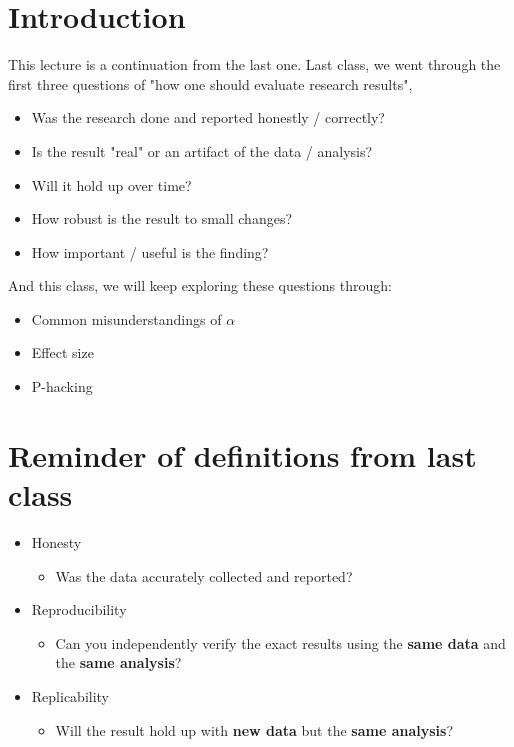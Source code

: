 
\section{Introduction}
This lecture is a continuation from the last one. Last class, we went through the first three questions of "how one should evaluate research results", 
\begin{itemize}
  \item Was the research done and reported honestly / correctly?
  \item Is the result "real" or an artifact of the data / analysis?
  \item Will it hold up over time?
  \item How robust is the result to small changes?
  \item How important / useful is the finding?
\end{itemize}
And this class, we will keep exploring these questions through:
\begin{itemize}
    \item Common misunderstandings of $\alpha$
    \item Effect size 
    \item P-hacking
\end{itemize}



\section{Reminder of definitions from last class}
\begin{itemize}
    \item Honesty
    \begin{itemize}
        \item Was the data accurately collected and reported?
    \end{itemize}
    \item Reproducibility
    \begin{itemize}
        \item Can you independently verify the exact results using the \textbf{same data} and the \textbf{same analysis}?
    \end{itemize}
    \item Replicability
    \begin{itemize}
        \item Will the result hold up with \textbf{new data} but the \textbf{same analysis}?
    \end{itemize}
\end{itemize}


